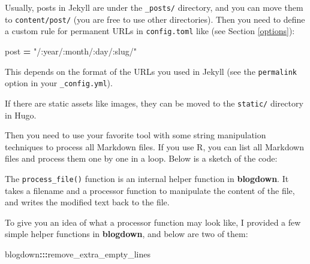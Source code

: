 \documentclass[12pt,]{krantz}
\makeatletter
\newenvironment{Shaded}{\begin{snugshade}}{\end{snugshade}}
\newcommand{\CommentTok}[1]{\textcolor[rgb]{0.56,0.35,0.01}{\textit{#1}}}
\newcommand{\ControlFlowTok}[1]{\textcolor[rgb]{0.13,0.29,0.53}{\textbf{#1}}}
\newcommand{\DataTypeTok}[1]{\textcolor[rgb]{0.13,0.29,0.53}{#1}}
\newcommand{\KeywordTok}[1]{\textcolor[rgb]{0.13,0.29,0.53}{\textbf{#1}}}
\newcommand{\NormalTok}[1]{#1}
\newcommand{\OperatorTok}[1]{\textcolor[rgb]{0.81,0.36,0.00}{\textbf{#1}}}
\newcommand{\OtherTok}[1]{\textcolor[rgb]{0.56,0.35,0.01}{#1}}
\newcommand{\StringTok}[1]{\textcolor[rgb]{0.31,0.60,0.02}{#1}}
\newenvironment{kframe}{%
\medskip{}
\setlength{\fboxsep}{.8em}
 \def\at@end@of@kframe{}%
 \ifinner\ifhmode%
  \def\at@end@of@kframe{\end{minipage}}%
  \begin{minipage}{\columnwidth}%
 \fi\fi%
 \def\FrameCommand##1{\hskip\@totalleftmargin \hskip-\fboxsep
 \colorbox{shadecolor}{##1}\hskip-\fboxsep
     \hskip-\linewidth \hskip-\@totalleftmargin \hskip\columnwidth}%
 \MakeFramed {\advance\hsize-\width
   \@totalleftmargin\z@ \linewidth\hsize
   \@setminipage}}%
 {\par\unskip\endMakeFramed%
 \at@end@of@kframe}
\renewenvironment{Shaded}{\begin{kframe}}{\end{kframe}}
\theoremstyle{definition}
\theoremstyle{definition}
\theoremstyle{definition}
\theoremstyle{remark}
\makeatother
\begin{document}
Usually, posts in Jekyll are under the \texttt{\_posts/} directory, and
you can move them to \texttt{content/post/} (you are free to use other
directories). Then you need to define a custom rule for permanent URLs
in \texttt{config.toml} like (see Section \ref{options}):

\begin{Shaded}
\begin{Highlighting}[]
\NormalTok{[permalinks]}
\NormalTok{    post }\OperatorTok{=} \StringTok{"/:year/:month/:day/:slug/"}
\end{Highlighting}
\end{Shaded}

This depends on the format of the URLs you used in Jekyll (see the
\texttt{permalink} option in your \texttt{\_config.yml}).

If there are static assets like images, they can be moved to the
\texttt{static/} directory in Hugo.

Then you need to use your favorite tool with some string manipulation
techniques to process all Markdown files. If you use R, you can list all
Markdown files and process them one by one in a loop. Below is a sketch
of the code:

\begin{Shaded}
\end{Shaded}

The \texttt{process\_file()} function is an internal helper function in
\textbf{blogdown}. It takes a filename and a processor function to
manipulate the content of the file, and writes the modified text back to
the file.

To give you an idea of what a processor function may look like, I
provided a few simple helper functions in \textbf{blogdown}, and below
are two of them:

\begin{Shaded}
\begin{Highlighting}[]
\NormalTok{blogdown}\OperatorTok{:::}\NormalTok{remove_extra_empty_lines}
\end{Highlighting}
\end{Shaded}
\end{document}
